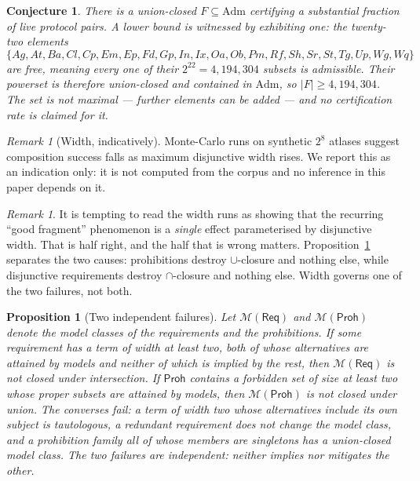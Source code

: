 \documentclass[11pt,reqno]{amsart}
\theoremstyle{plain}
\newtheorem{proposition}[theorem]{Proposition}
\newtheorem{conjecture}[theorem]{Conjecture}
\theoremstyle{definition}
\theoremstyle{remark}
\newtheorem{remark}[theorem]{Remark}
\newcommand{\Admf}{\mathrm{Adm}}
\newcommand{\Law}{\mathsf{Req}}
\newcommand{\Haz}{\mathsf{Proh}}
\begin{document}
\begin{conjecture}\label{conj:frag}
There is a union-closed $F \subseteq \Admf$ certifying a substantial fraction of
live protocol pairs. A lower bound is witnessed by exhibiting one: the twenty-two
elements
\[
  \{Ag,At,Ba,Cl,Cp,Em,Ep,Fd,Gp,In,Ix,Oa,Ob,Pm,Rf,Sh,Sr,St,Tg,Up,Wg,Wq\}
\]
are \emph{free}, meaning every one of their $2^{22} = 4{,}194{,}304$ subsets is
admissible. Their powerset is therefore union-closed and contained in $\Admf$,
so $|F| \geq 4{,}194{,}304$. The set is not maximal --- further elements can be
added --- and no certification rate is claimed for it.
\end{conjecture}

\begin{remark}[Width, indicatively]
Monte-Carlo runs on synthetic $2^8$ atlases suggest composition success falls as
maximum disjunctive width rises. We report this as an indication only: it is not
computed from the corpus and no inference in this paper depends on it.
\end{remark}

\begin{remark}
It is tempting to read the width runs as showing that the recurring
``good fragment'' phenomenon is a \emph{single} effect parameterised by
disjunctive width. That is half right, and the half that is wrong matters.
Proposition~\ref{prop:twoeffects} separates the two causes: prohibitions destroy
$\cup$-closure and nothing else, while disjunctive requirements destroy
$\cap$-closure and nothing else. Width governs one of the two failures, not both.
\end{remark}

\begin{proposition}[Two independent failures]\label{prop:twoeffects}
Let $\mathcal{M}(\Law)$ and $\mathcal{M}(\Haz)$ denote the model classes of the
requirements and the prohibitions. If some requirement has a term of width at
least two, both of whose alternatives are attained by models and neither of
which is implied by the rest, then $\mathcal{M}(\Law)$ is not closed under
intersection. If $\Haz$ contains a forbidden set of size at least two whose
proper subsets are attained by models, then $\mathcal{M}(\Haz)$ is not closed
under union. The converses fail: a term of width two whose alternatives include
its own subject is tautologous, a redundant requirement does not change the
model class, and a prohibition family all of whose members are singletons has a
union-closed model class. The two failures are independent: neither implies nor
mitigates the other.
\end{proposition}
\end{document}
